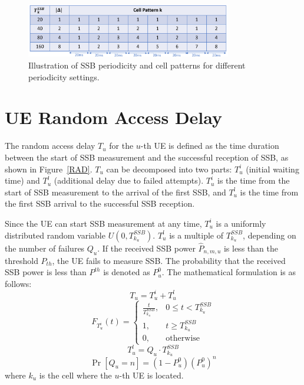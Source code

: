 \begin{figure}[h!]
    \centering
    \includegraphics[width=0.8\textwidth]{figure/delta pattern.pdf}
    \caption{Illustration of SSB periodicity and cell patterns for different periodicity settings.}
    \label{delta}
\end{figure}

\section{UE Random Access Delay}
The random access delay $T_u$ for the $u$-th UE is defined as the time duration between the start of SSB measurement and the successful reception of SSB, as shown in Figure~\ref{RAD}. $T_u$ can be decomposed into two parts: $T_u^i$ (initial waiting time) and $T_u^l$ (additional delay due to failed attempts). $T_u^i$ is the time from the start of SSB measurement to the arrival of the first SSB, and $T_u^l$ is the time from the first SSB arrival to the successful SSB reception.

Since the UE can start SSB measurement at any time, $T_u^i$ is a uniformly distributed random variable $U(0, T_{k_u}^{SSB})$. $T_u^l$ is a multiple of $T_{k_u}^{SSB}$, depending on the number of failures $Q_u$. If the received SSB power $\hat{P}_{n, m, u}$ is less than the threshold $P_{th}$, the UE fails to measure SSB. The probability that the received SSB power is less than $P^{th}$ is denoted as $P_u^0$. The mathematical formulation is as follows:
\begin{equation}
    T_u = T_u^i + T_u^l
\end{equation}
\begin{equation}
    F_{T_u^i}(t) =
    \begin{cases}
        \frac{t}{T_{k_u}^{SSB}}, & 0 \leq t < T_{k_u}^{SSB} \\
        1, & t \geq T_{k_u}^{SSB} \\
        0, & \text{otherwise}
    \end{cases}
\end{equation}
\begin{equation}
    T_u^l = Q_u \cdot T_{k_u}^{SSB}
\end{equation}
\begin{equation}
    \Pr\left[Q_u = n\right] = (1 - P_u^0) (P_u^0)^n
\end{equation}
where $k_u$ is the cell where the $u$-th UE is located.

